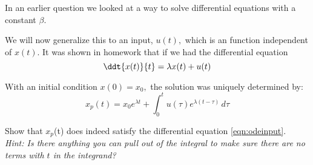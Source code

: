 

In an earlier question we looked at a way to solve differential equations with a constant $\beta.$
\par

We will now generalize this to an input, $u(t),$ which is an function independent of $x(t)$.
It was shown in homework that if we had the differential equation
\begin{equation} \label{eqn:odeinput}
  \ddt{x(t)}{t} = \lambda x(t) + u(t)
\end{equation}

With an initial condition $x(0) = x_0,$ the solution was uniquely determined by:
\begin{equation} \label{eqn:odesol}
    x_{p}(t) = x_{0}e^{\lambda{}t} + \int_0^t \! u(\tau{})e^{\lambda{}(t - \tau{})} \, d\tau{}
\end{equation}

\begin{enumerate}

\qitem Show that $x_{p}$(t) does indeed satisfy the differential equation \eqref{eqn:odeinput}. \\
\textit{Hint: Is there anything you can pull out of the integral to make sure there are no terms with $t$ in the integrand?}



\end{enumerate}

